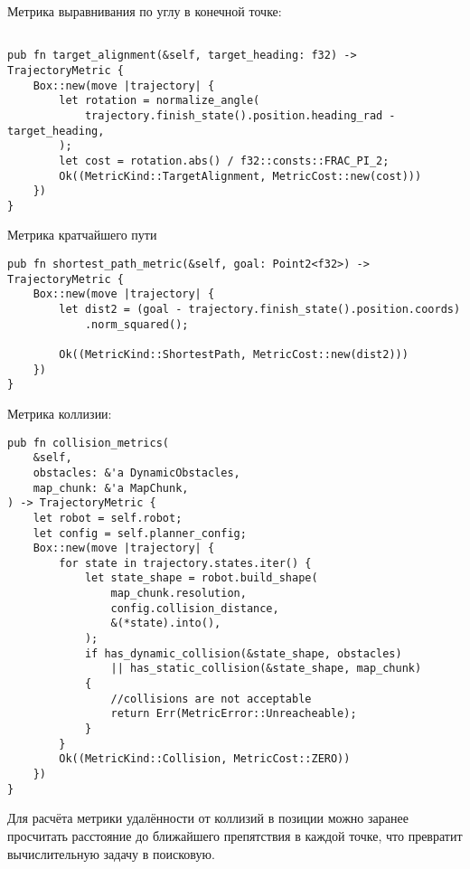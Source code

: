 Метрика выравнивания по углу в конечной точке: 
\begin{lstlisting}

pub fn target_alignment(&self, target_heading: f32) -> TrajectoryMetric {
    Box::new(move |trajectory| {
        let rotation = normalize_angle(
            trajectory.finish_state().position.heading_rad - target_heading,
        );
        let cost = rotation.abs() / f32::consts::FRAC_PI_2;
        Ok((MetricKind::TargetAlignment, MetricCost::new(cost)))
    })
}
\end{lstlisting}

Метрика кратчайшего пути
\begin{lstlisting}
pub fn shortest_path_metric(&self, goal: Point2<f32>) -> TrajectoryMetric {
    Box::new(move |trajectory| {
        let dist2 = (goal - trajectory.finish_state().position.coords)
            .norm_squared();

        Ok((MetricKind::ShortestPath, MetricCost::new(dist2)))
    })
}
\end{lstlisting}


Метрика коллизии:
\begin{lstlisting}
pub fn collision_metrics(
    &self,
    obstacles: &'a DynamicObstacles,
    map_chunk: &'a MapChunk,
) -> TrajectoryMetric {
    let robot = self.robot;
    let config = self.planner_config;
    Box::new(move |trajectory| {
        for state in trajectory.states.iter() {
            let state_shape = robot.build_shape(
                map_chunk.resolution,
                config.collision_distance,
                &(*state).into(),
            );
            if has_dynamic_collision(&state_shape, obstacles)
                || has_static_collision(&state_shape, map_chunk)
            {
                //collisions are not acceptable
                return Err(MetricError::Unreacheable);
            }
        }
        Ok((MetricKind::Collision, MetricCost::ZERO))
    })
}
\end{lstlisting}

Для расчёта метрики удалённости от коллизий в позиции можно заранее просчитать
расстояние до ближайшего препятствия в каждой точке, что превратит
вычислительную задачу в поисковую.



